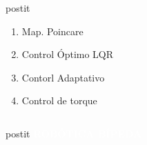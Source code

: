 {\begin{frame}[label=resumen]
\begin{center}
{\begin{columns}[c]
\begin{column}{3cm}
\begin{beamercolorbox}[sep=0.5em,wd=3cm,rounded=true,center,shadow=true]{postit}
\begin{enumerate}
              \item Map. Poincare
              \item Control \'Optimo LQR
              \item Contorl Adaptativo
              \item Control de torque
              \end{enumerate}
            \end{beamercolorbox}
          \end{column}
        \end{columns}
        \vspace{-4.6cm}
        \hspace{-0.25cm}
        \begin{beamercolorbox}[sep=0.5em,wd=4.0cm,rounded=true,center]{postit}
          \textbf{\Large\textcolor{white}{ROB\'OTICA B\'IPEDA}}
        \end{beamercolorbox}
      }
    \end{center}
  \end{frame}
}
